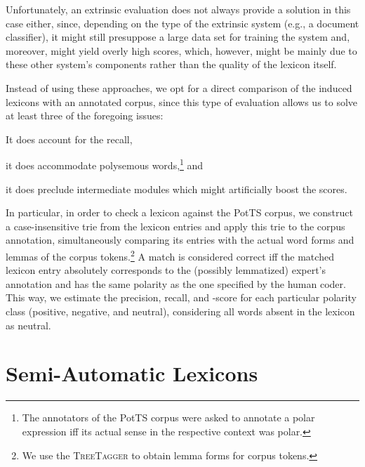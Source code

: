 Unfortunately, an extrinsic evaluation does not always provide a
solution in this case either, since, depending on the type of the
extrinsic system (e.g., a document classifier), it might still
presuppose a large data set for training the system and, moreover,
might yield overly high scores, which, however, might be mainly due to
these other system's components rather than the quality of the lexicon
itself.

Instead of using these approaches, we opt for a direct comparison of
the induced lexicons with an annotated corpus, since this type of
evaluation allows us to solve at least three of the foregoing issues:
\begin{inparaenum}[(i)]
  \item It does account for the recall,
  \item it does accommodate polysemous words,\footnote{The annotators
      of the PotTS corpus were asked to annotate a polar expression
      iff its actual sense in the respective context was polar.} and
  \item it does preclude intermediate modules which might artificially
    boost the scores.
\end{inparaenum}

In particular, in order to check a lexicon against the PotTS corpus,
we construct a case-insensitive trie \cite[pp. 492--512]{Knuth:98}
from the lexicon entries and apply this trie to the corpus annotation,
simultaneously comparing its entries with the actual word forms and
lemmas of the corpus tokens.\footnote{We use the \textsc{TreeTagger}
  \cite{Schmid:95} to obtain lemma forms for corpus tokens.} A match
is considered correct iff the matched lexicon entry absolutely
corresponds to the (possibly lemmatized) expert's annotation and has
the same polarity as the one specified by the human coder.  This way,
we estimate the precision, recall, and \F{}-score for each particular
polarity class (positive, negative, and neutral), considering all
words absent in the lexicon as neutral.

\section{Semi-Automatic Lexicons}

